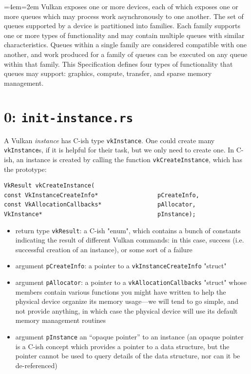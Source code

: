 \documentclass[12pt,letterpaper]{article}
\newcommand{\inquotes}[1]{``#1''}	%
\newcommand{\cil}[1]{\texttt{#1}}
\newenvironment{indenttext}{%
	\par%
	\medskip
	\leftskip=4em\rightskip=2em%
	\noindent\ignorespaces}{%
	\par\medskip}
\renewenvironment{quotation}{\begin{indenttext}\fontfamily{LinuxLibertineT-OsF}\selectfont}{\end{indenttext}}
\begin{document}
\begin{quotation}
    Vulkan exposes one or more devices, each of which exposes one or more queues which may process work asynchronously to one another. The set of queues supported by a device is partitioned into families. Each family supports one or more types of functionality and may contain multiple queues with similar characteristics. Queues within a single family are considered compatible with one another, and work produced for a family of queues can be executed on any queue within that family. This Specification defines four types of functionality that queues may support: graphics, compute, transfer, and sparse memory management.
\end{quotation}

\section{0: \texttt{init-instance.rs}}

A Vulkan \emph{instance} has C-ish type \cil{vkInstance}. One could create many \cil{vkInstance}s, if it is helpful for their task, but we only need to create one. In C-ish, an instance is created by calling the function \cil{vkCreateInstance}, which has the prototype:
		\begin{verbatim}
VkResult vkCreateInstance(
const VkInstanceCreateInfo*                 pCreateInfo,
const VkAllocationCallbacks*                pAllocator,
VkInstance*                                 pInstance);
		\end{verbatim}
        
		\begin{itemize}
			\item return type \cil{vkResult}: a C-ish "enum", which contains a bunch of  constants indicating the result of different Vulkan commands: in this case, success (i.e. successful creation of an instance), or some sort of a failure
			
			\item argument \cil{pCreateInfo}: a pointer to a \cil{vkInstanceCreateInfo} "struct"
			
			\item argument \cil{pAllocator}: a pointer to a \cil{vkAllocationCallbacks} "struct" whose members contain various functions you might have written to help the physical device organize its memory usage---we will tend to go simple, and not provide anything, in which case the physical device will use its default memory management routines
			
			\item argument \cil{pInstance} an \inquotes{opaque pointer} to an instance (an opaque pointer is a C-ish concept which provides a pointer to a data structure, but the pointer cannot be used to query details of the data structure, nor can it be de-referenced)
		\end{itemize}
\end{document}
